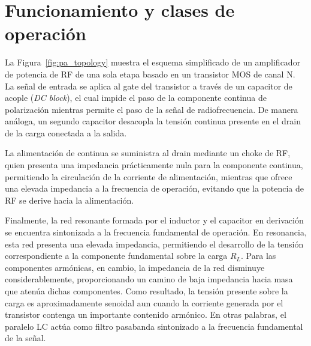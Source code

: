 \section{Funcionamiento y clases de operación} \label{sec:funcionamiento_clases}
La Figura~\ref{fig:pa_topology} muestra el esquema simplificado de un amplificador de potencia de RF de una sola etapa basado en un transistor MOS de canal N. La señal de entrada se aplica al gate del transistor a través de un capacitor de acople (\textit{DC block}), el cual impide el paso de la componente continua de polarización mientras permite el paso de la señal de radiofrecuencia. De manera análoga, un segundo capacitor desacopla la tensión continua presente en el drain de la carga conectada a la salida.

La alimentación de continua se suministra al drain mediante un choke de RF, quien presenta una impedancia prácticamente nula para la componente continua, permitiendo la circulación de la corriente de alimentación, mientras que ofrece una elevada impedancia a la frecuencia de operación, evitando que la potencia de RF se derive hacia la alimentación.

Finalmente, la red resonante formada por el inductor y el capacitor en derivación se encuentra sintonizada a la frecuencia fundamental de operación. En resonancia, esta red presenta una elevada impedancia, permitiendo el desarrollo de la tensión correspondiente a la componente fundamental sobre la carga \(R_L\). Para las componentes armónicas, en cambio, la impedancia de la red disminuye considerablemente, proporcionando un camino de baja impedancia hacia masa que atenúa dichas componentes. Como resultado, la tensión presente sobre la carga es aproximadamente senoidal aun cuando la corriente generada por el transistor contenga un importante contenido armónico. En otras palabras, el paralelo LC actúa como filtro pasabanda sintonizado a la frecuencia fundamental de la señal.

